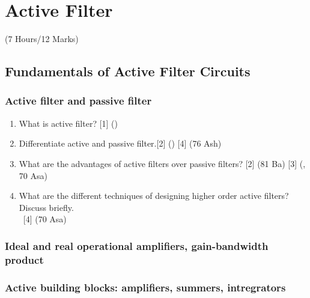 \documentclass[12pt]{article}
\newcommand{\enter}{\\\textcolor{white}{1}}
\begin{document}
	\pagebreak
\section{Active Filter}
	\begin{center}(7 Hours/12 Marks)\end{center}
	\subsection{Fundamentals of Active Filter Circuits}
		\subsubsection{Active filter and passive filter}
		\begin{enumerate}
			\item What is active filter? \hfill [1] ()

			\item Differentiate active and passive filter.\hfill [2] () [4] (76 Ash)
			
			\item What are the advantages of active filters over passive filters? \hfill [2] (81 Ba) [3] (, 70 Asa)

			\item What are the different techniques of designing higher order active filters? Discuss briefly.
			\enter\hfill [4] (70 Asa)
		\end{enumerate}
		
		\subsubsection{Ideal and real operational amplifiers, gain-bandwidth product}
		\subsubsection{Active building blocks: amplifiers, summers, intregrators}
\end{document}
